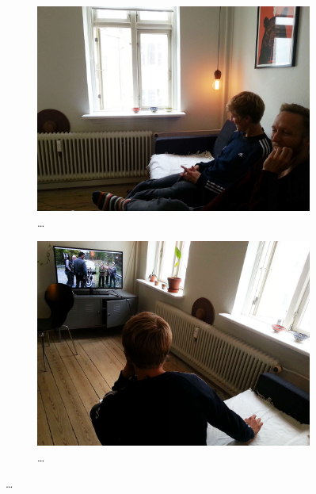 \begin{figure}
        \centering
        \begin{subfigure}[b]{0.44\textwidth}
                \centering
                \includegraphics[width=\textwidth]{figures/touch/evaluation/sebastian/in_sofa}
                \caption{\dots}
                \label{fig:textiletouch:eval:sebastian:sofa}
        \end{subfigure}%
        \hspace{0.02\textwidth}
        \begin{subfigure}[b]{0.44\textwidth}
                \centering
                \includegraphics[width=\textwidth]{figures/touch/evaluation/sebastian/sofa_behind_seb}
                \caption{\dots}
                \label{fig:textiletouch:eval:sebastian:sofa_behind}
        \end{subfigure}


\end{figure}
